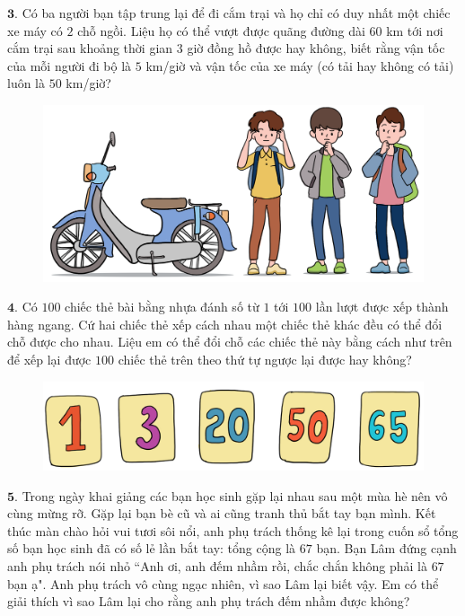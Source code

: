 \begin{multicols}{2}
\begin{figure}[H]
		\vspace*{-10pt}
	\end{figure}
	\vskip 0.1cm
	$\pmb{3.}$ Có ba người bạn tập trung lại để đi cắm trại và họ chỉ có duy nhất một chiếc xe máy có $2$ chỗ ngồi. Liệu họ có thể vượt được quãng đường dài $60$ km tới nơi cắm trại sau khoảng thời gian $3$ giờ đồng hồ được hay không, biết rằng vận tốc của mỗi người đi bộ là $5$ km/giờ và vận tốc của xe máy (có tải hay không có tải) luôn là $50$ km/giờ?
	\begin{figure}[H]
		\centering
		\vspace*{-5pt}
		\captionsetup{labelformat= empty, justification=centering}
		\includegraphics[width=1\linewidth]{Pi10_ToanBi_Bai3}
		\vspace*{-15pt}
	\end{figure}
	$\pmb{4.}$ Có $100$ chiếc thẻ bài bằng nhựa đánh số từ $1$ tới $100$ lần lượt được xếp thành hàng ngang. Cứ hai chiếc thẻ xếp cách nhau một chiếc thẻ khác đều có thể đổi chỗ được cho nhau. Liệu em có thể đổi chỗ các chiếc thẻ này bằng cách như trên để xếp lại được $100$ chiếc thẻ trên theo thứ tự ngược lại được hay không?
	\begin{figure}[H]
		\centering
		\vspace*{-5pt}
		\captionsetup{labelformat= empty, justification=centering}
		\includegraphics[width=1\linewidth]{Pi10_ToanBi_Bai4}
		\vspace*{-15pt}
	\end{figure}
	$\pmb{5.}$ Trong ngày khai giảng các bạn học sinh gặp lại nhau sau một mùa hè nên vô cùng mừng rỡ. Gặp lại bạn bè cũ và ai cũng tranh thủ bắt tay bạn mình. Kết thúc màn chào hỏi vui tươi sôi nổi, anh phụ trách thống kê lại trong cuốn sổ tổng số bạn học sinh đã có số lẻ lần bắt tay: tổng cộng là $67$ bạn. Bạn Lâm đứng cạnh anh phụ trách nói nhỏ ``Anh ơi, anh đếm nhầm rồi, chắc chắn không phải là $67$ bạn ạ". Anh phụ trách vô cùng ngạc nhiên, vì sao Lâm lại biết vậy. Em có thể giải thích vì sao Lâm lại cho rằng anh phụ trách đếm nhầm được không?

\end{multicols}
